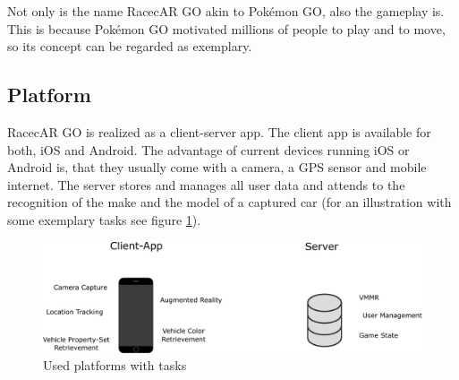 Not only is the name RacecAR GO akin to Pokémon GO, also the gameplay is. This is because Pokémon GO motivated millions of people to play and to move, so its concept can be regarded as exemplary.

\subsection{Platform}
RacecAR GO is realized as a client-server app. The client app is available for both, iOS and Android. The advantage of current devices running iOS or Android is, that they usually come with a camera, a GPS sensor and mobile internet. The server stores and manages all user data and attends to the recognition of the make and the model of a captured car (for an illustration with some exemplary tasks see figure \ref{fig:platform}).

\begin{figure}[bth]
  \centering
        \includegraphics[width=.95\linewidth]{gfx/platform}
        \caption{Used platforms with tasks}
        \label{fig:platform}
\end{figure}

